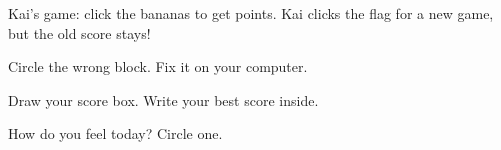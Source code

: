 \begin{exercise}
Kai's game: click the bananas to get points. Kai clicks the flag for a new game, but the old score stays!
\begin{center}
\begin{scratch}[scale=0.8]
\end{scratch}
\qquad
\begin{scratch}[scale=0.8]
\end{scratch}
\end{center}
Circle the wrong block. Fix it on your computer.
\end{exercise}

\begin{vocab}
\end{vocab}

\begin{reflection}
Draw your score box. Write your best score inside.
\answerspace{3cm}

How do you feel today? Circle one.

\begin{center}
\Huge\faSmile[regular]\qquad\faMeh[regular]\qquad\faFrown[regular]
\end{center}
\end{reflection}
